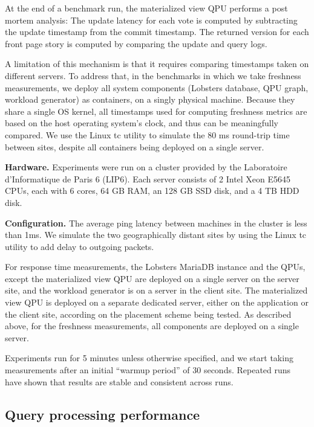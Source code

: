 At the end of a benchmark run, the materialized view QPU performs a post mortem analysis:
The update latency for each vote is computed by subtracting the update timestamp from the commit timestamp.
The returned version for each front page story is computed by comparing the update and query logs.

A limitation of this mechanism is that it requires comparing timestamps taken on different servers.
To address that, in the benchmarks in which we take freshness measurements,
we deploy all system components (Lobsters database, QPU graph, workload generator) as containers,
on a singly physical machine.
Because they share a single OS kernel, all timestamps used for computing freshness metrics are based
on the host operating system's clock, and thus can be meaningfully compared.
We use the Linux tc utility \cite{tc} to simulate the 80 ms round-trip time between sites,
despite all containers being deployed on a single server.

\bigskip
\noindent
\textbf{Hardware.}
Experiments were run on a cluster provided by the Laboratoire d'Informatique de Paris 6 (LIP6).
Each server consists of 2 Intel Xeon E5645 CPUs, each with 6 cores, 64 GB RAM, an 128 GB SSD disk, and a 4 TB HDD disk.

\bigskip
\noindent
\textbf{Configuration.}
The average ping latency between machines in the cluster is less than 1ms.
We simulate the two geographically distant sites by using the Linux tc utility \cite{tc} to add delay to outgoing packets.

For response time measurements, the Lobsters MariaDB instance and the QPUs, except the materialized view QPU are deployed
on a single server on the server site, and the workload generator is on a server in the client site.
The materialized view QPU is deployed on a separate dedicated server, either on the application or the client site,
according on the placement scheme being tested.
As described above, for the freshness measurements, all components are deployed on a single server.

Experiments run for 5 minutes unless otherwise specified, and we start taking measurements after an initial
``warmup period'' of 30 seconds.
Repeated runs have shown that results are stable and consistent across runs.


\subsection{Query processing performance}
\label{sec:eval_query_processing_perf}


